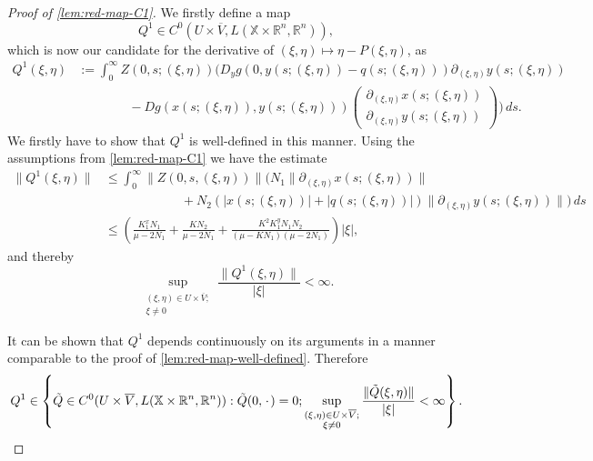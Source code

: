 \documentclass[10pt,a4paper]{amsart}
\newcommand{\RSet}{\mathbb{R}}
\newcommand{\XSet}{\mathbb{X}}
\newcommand\blank{{\mkern 2mu\cdot\mkern 2mu}}
\begin{document}
\begin{proof}[Proof of \cref{lem:red-map-C1}]
We firstly define a map
\[
Q^1 \in C^0(U \times \overline{V}, L(\XSet \times \RSet^n, \RSet^n)),
\]
which is now our candidate for the derivative of $(\xi,\eta) \mapsto \eta - P(\xi,\eta)$, as
\begin{align*}
Q^1(\xi,\eta) &:=  \int_0^{\infty} Z(0,s; (\xi,\eta)) \Bigg( D_y g(0,y(s;(\xi,\eta)) - q(s;(\xi,\eta))) \partial_{(\xi,\eta)}y(s; (\xi,\eta))  \\
&\qquad \qquad - D g(x(s;(\xi,\eta)),y(s;(\xi,\eta))) \begin{pmatrix} \partial_{(\xi,\eta)}x(s; (\xi,\eta)) \\ \partial_{(\xi,\eta)}y(s; (\xi,\eta)) \end{pmatrix} \Bigg) \, ds.
\end{align*}
We firstly have to show that $Q^1$ is well-defined in this manner. Using the
assumptions from \cref{lem:red-map-C1} we have the estimate
\begin{align*}
\| Q^1(\xi,\eta) \| &\leq  \int_0^{\infty} \| Z(0,s, (\xi,\eta)) \| \bigg( N_1 \| \partial_{(\xi,\eta)}x(s; (\xi,\eta)) \| \\
&\qquad \qquad \qquad + N_2 \left( |x(s; (\xi,\eta))| + |q(s; (\xi,\eta))| \right) \| \partial_{(\xi,\eta)}y(s; (\xi,\eta)) \| \bigg)  \, ds \\
&\leq \left( \frac{K^x_1 N_1}{\mu -  2 N_1} + \frac{K N_2 }{\mu - 2N_1} + \frac{K^2 K^y_1 N_1 N_2}{(\mu - K N_1)(\mu - 2 N_1)} \right) |\xi|,
\end{align*}
and thereby
\[
\sup_{\substack{(\xi,\eta) \in U \times \overline{V}; \\ \xi \neq 0}} \frac{\|Q^1(\xi,\eta)\|}{|\xi|} < \infty.
\]

It can be shown that $Q^1$ depends continuously on its arguments in a manner
comparable to the proof of \cref{lem:red-map-well-defined}. Therefore
\[
Q^1 \in \left\{ \tilde{Q} \in C^{0}(U \times \overline{V}, L(\XSet \times \RSet^n, \RSet^n)): \tilde{Q}(0, \blank) = 0 ;  \sup_{\substack{(\xi,\eta) \in U \times \overline{V}; \\ \xi \neq 0}} \frac{\|\tilde{Q}(\xi,\eta)\|}{|\xi|} < \infty  \right\}.
\]


\end{proof}
\end{document}
